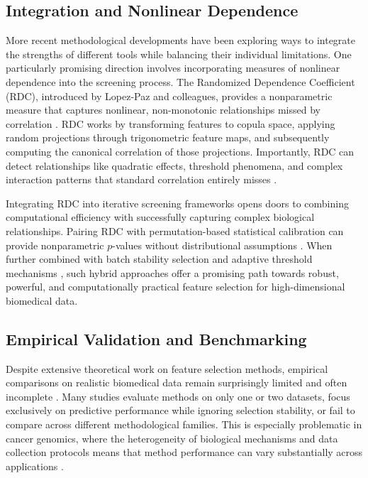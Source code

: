 \documentclass[11pt]{article}
\begin{document}
\subsection{Integration and Nonlinear Dependence}

More recent methodological developments have been exploring ways to integrate the strengths of
different tools while balancing their individual limitations. One particularly promising direction
involves incorporating measures of nonlinear dependence into the screening process. The Randomized
Dependence Coefficient (RDC), introduced by Lopez-Paz and colleagues, provides a nonparametric
measure that captures nonlinear, non-monotonic relationships missed by correlation
\citep{lopezpaz2013}. RDC works by transforming features to copula space, applying random projections
through trigonometric feature maps, and subsequently computing the canonical correlation of those
projections. Importantly, RDC can detect relationships like quadratic effects, threshold phenomena,
and complex interaction patterns that standard correlation entirely misses \citep{lopezpaz2013}.

Integrating RDC into iterative screening frameworks opens doors to combining computational efficiency
with successfully capturing complex biological relationships. Pairing RDC with permutation-based
statistical calibration can provide nonparametric $p$-values without distributional assumptions
\citep{ernst2004}. When further combined with batch stability selection \citep{hofner2015} and
adaptive threshold mechanisms \citep{salvador2004}, such hybrid approaches offer a promising path
towards robust, powerful, and computationally practical feature selection for high-dimensional
biomedical data.

\subsection{Empirical Validation and Benchmarking}

Despite extensive theoretical work on feature selection methods, empirical comparisons on realistic
biomedical data remain surprisingly limited and often incomplete
\citep{saeys2007,chandrashekar2014,michiels2005}. Many studies evaluate methods on only one or two
datasets, focus exclusively on predictive performance while ignoring selection stability, or fail to
compare across different methodological families. This is especially problematic in cancer genomics,
where the heterogeneity of biological mechanisms and data collection protocols means that method
performance can vary substantially across applications
\citep{saeys2007,salvador2004,feltes2019}.
\end{document}
